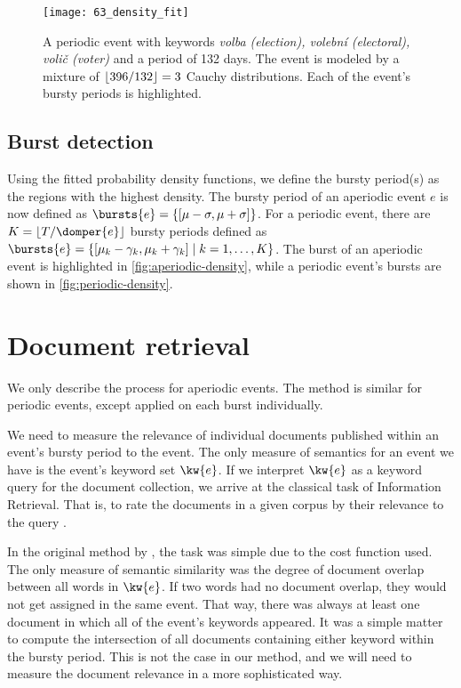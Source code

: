 \begin{figure}
  \centering
  \texttt{[image: 63\_density\_fit]}  %
  \caption{A periodic event with keywords \textit{volba (election), volební (electoral), volič (voter)} and a period of 132 days. The event is modeled by a mixture of $\lfloor396/132\rfloor = 3$ Cauchy distributions. Each of the event's bursty periods is highlighted.}
  \label{fig:periodic-density}
\end{figure}


\subsection{Burst detection}
Using the fitted probability density functions, we define the bursty period(s) as the regions with the highest density. The bursty period of an aperiodic event $e$ is now defined as $\bursts{e} = \left\{ \interval{\mu - \sigma}{\mu + \sigma} \right\}$. For a periodic event, there are $K = \floor{\streamlen / \domper{e}}$ bursty periods defined as $\bursts{e} = \left\{ \interval{\mu_{k} - \gamma_{k}}{\mu_{k} + \gamma_{k}} \mid k = 1, \dots, K \right\}$. The burst of an aperiodic event is highlighted in \autoref{fig:aperiodic-density}, while a periodic event's bursts are shown in \autoref{fig:periodic-density}.


\section{Document retrieval}
We only describe the process for aperiodic events. The method is similar for periodic events, except applied on each burst individually.

We need to measure the relevance of individual documents published within an event's bursty period to the event. The only measure of semantics for an event we have is the event's keyword set $\kw{e}$. If we interpret $\kw{e}$ as a keyword query for the document collection, we arrive at the classical task of Information Retrieval. That is, to rate the documents in a given corpus by their relevance to the query \citep{information-retrieval}.

In the original method by \cite{event-detection}, the task was simple due to the cost function used. The only measure of semantic similarity was the degree of document overlap between all words in $\kw{e}$. If two words had no document overlap, they would not get assigned in the same event. That way, there was always at least one document in which all of the event's keywords appeared. It was a simple matter to compute the intersection of all documents containing either keyword within the bursty period. This is not the case in our method, and we will need to measure the document relevance in a more sophisticated way.

